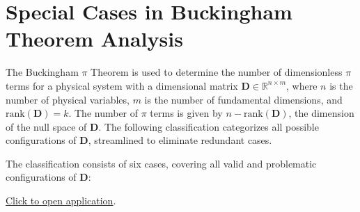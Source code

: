 \documentclass[
	11pt, %
	fleqn, %
	a4paper, %
]{LegrandOrangeBook}
\begin{document}
\section{Special Cases in Buckingham Theorem Analysis}
\label{sec:buckinghamcases}

The Buckingham $\pi$ Theorem is used to determine the number of dimensionless $\pi$ terms for a physical system with a dimensional matrix $\mathbf{D} \in \mathbb{R}^{n \times m}$, where $n$ is the number of physical variables, $m$ is the number of fundamental dimensions, and $\text{rank}(\mathbf{D}) = k$. The number of $\pi$ terms is given by $n - \text{rank}(\mathbf{D})$, the dimension of the null space of $\mathbf{D}$. The following classification categorizes all possible configurations of $\mathbf{D}$, streamlined to eliminate redundant cases.

The classification consists of six cases, covering all valid and problematic configurations of $\mathbf{D}$:

\href{http://enriquecastilloron.github.io/PRUEBA/ObtainPiTerms_Flexible_LinearBUENO9a.html}{\underline{Click to open application}}.
\end{document}
